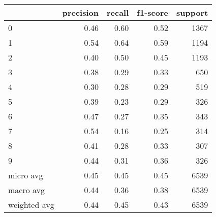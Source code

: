 \begin{tabular}{lrrrr}
\toprule
{} &  precision  &  recall  &  f1-score  &  support  \\
\midrule
0             &        0.46 &     0.60 &       0.52 &      1367 \\
1             &        0.54 &     0.64 &       0.59 &      1194 \\
2             &        0.40 &     0.50 &       0.45 &      1193 \\
3             &        0.38 &     0.29 &       0.33 &       650 \\
4             &        0.30 &     0.28 &       0.29 &       519 \\
5             &        0.39 &     0.23 &       0.29 &       326 \\
6             &        0.47 &     0.27 &       0.35 &       343 \\
7             &        0.54 &     0.16 &       0.25 &       314 \\
8             &        0.41 &     0.28 &       0.33 &       307 \\
9             &        0.44 &     0.31 &       0.36 &       326 \\
micro avg     &        0.45 &     0.45 &       0.45 &      6539 \\
macro avg     &        0.44 &     0.36 &       0.38 &      6539 \\
weighted avg  &        0.44 &     0.45 &       0.43 &      6539 \\
\bottomrule
\end{tabular}

